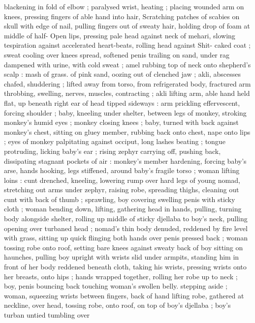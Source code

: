 blackening in fold of elbow ; paralysed wrist, heating ; placing 
wounded arm on knees, pressing fingers of able hand into hair, 
Scratching patches of scabies on skull with edge of nail, pulling 
fingers out of sweaty hair, holding drop of foam at middle of half- 
Open lips, pressing pale head against neck of mehari, slowing 
tespiration against accelerated heart-beats, rolling head against 
Shit- caked coat ; sweat cooling over knees spread, softened penis 
trailing on sand, under rag dampened with urine, with cold sweat ; 
amel rubbing top of neck onto shepherd's scalp : mash of grass. of 
pink sand, oozing out of clenched jaw ; akli, abscesses chafed, 
shuddering ; lifted away from torso, from refrigerated body, fractured 
arm throbbing, swelling, nerves, muscles, contracting ; akli lifting 
arm, able hand held flat, up beneath right ear of head tipped 
sideways : arm prickling effervescent, forcing shoulder ; baby, 
kneeling under shelter, between legs of monkey, stroking monkey's 
humid eyes ; monkey closing knees ; baby, turned with back against 
monkey's chest, sitting on gluey member, rubbing back onto chest, 
nape onto lips ; eyes of monkey palpitating against occiput, long 
lashes beating ; tongue protruding, licking baby's ear ; rising zephyr 
carrying off, pushing back, dissipating stagnant pockets of air : 
monkey's member hardening, forcing baby's arse, hands hooking, 
legs stiffened, around baby's fragile torso ; woman lifting loins : cunt 
drenched, kneeling, lowering rump over hard legs of young nomad, 
stretching out arms under zephyr, raising robe, spreading thighs, 
cleaning out cunt with back of thumb ; sprawling, boy covering 
swelling penis with sticky cloth ; woman bending down, lifting, 
gathering head in hands, pulling, turning body alongside shelter, 
rolling up middle of sticky djellaba to boy's neck, pulling opening 
over turbaned head ; nomad's thin body denuded, reddened by fire 
level with grass, sitting up quick flinging both hands over penis 
pressed back ; woman tossing robe onto roof, setting bare knees 
against sweaty back of boy sitting on haunches, pulling boy upright 
with wrists slid under armpits, standing him in front of her body 
reddened beneath cloth, taking his wrists, pressing wrists onto her 
breasts, onto hips ; hands wrapped together, rolling her robe up to 
neck ; boy, penis bouncing back touching woman's swollen belly. 
stepping aside ; woman, squeezing wrists between fingers, back of 
hand lifting robe, gathered at neckline, over head, tossing robe, onto 
roof, on top of boy's djellaba ; boy's turban untied tumbling over 
